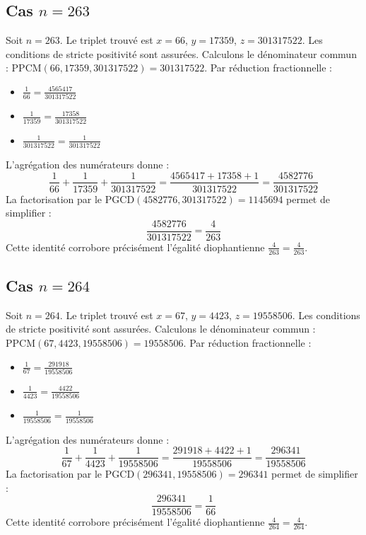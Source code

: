 \documentclass[11pt,a4paper]{article}
\begin{document}
\subsection{Cas $n = 263$}
Soit $n = 263$. Le triplet trouvé est $x = 66$, $y = 17359$, $z = 301317522$.
Les conditions de stricte positivité sont assurées.
Calculons le dénominateur commun : $\text{PPCM}(66, 17359, 301317522) = 301317522$.
Par réduction fractionnelle :
\begin{itemize}
    \item $\frac{1}{66} = \frac{4565417}{301317522}$
    \item $\frac{1}{17359} = \frac{17358}{301317522}$
    \item $\frac{1}{301317522} = \frac{1}{301317522}$
\end{itemize}
L'agrégation des numérateurs donne :
$$ \frac{1}{66} + \frac{1}{17359} + \frac{1}{301317522} = \frac{4565417 + 17358 + 1}{301317522} = \frac{4582776}{301317522} $$
La factorisation par le $\text{PGCD}(4582776, 301317522) = 1145694$ permet de simplifier :
$$ \frac{4582776}{301317522} = \frac{4}{263} $$
Cette identité corrobore précisément l'égalité diophantienne $\frac{4}{263} = \frac{4}{263}$.

\subsection{Cas $n = 264$}
Soit $n = 264$. Le triplet trouvé est $x = 67$, $y = 4423$, $z = 19558506$.
Les conditions de stricte positivité sont assurées.
Calculons le dénominateur commun : $\text{PPCM}(67, 4423, 19558506) = 19558506$.
Par réduction fractionnelle :
\begin{itemize}
    \item $\frac{1}{67} = \frac{291918}{19558506}$
    \item $\frac{1}{4423} = \frac{4422}{19558506}$
    \item $\frac{1}{19558506} = \frac{1}{19558506}$
\end{itemize}
L'agrégation des numérateurs donne :
$$ \frac{1}{67} + \frac{1}{4423} + \frac{1}{19558506} = \frac{291918 + 4422 + 1}{19558506} = \frac{296341}{19558506} $$
La factorisation par le $\text{PGCD}(296341, 19558506) = 296341$ permet de simplifier :
$$ \frac{296341}{19558506} = \frac{1}{66} $$
Cette identité corrobore précisément l'égalité diophantienne $\frac{4}{264} = \frac{4}{264}$.
\end{document}
